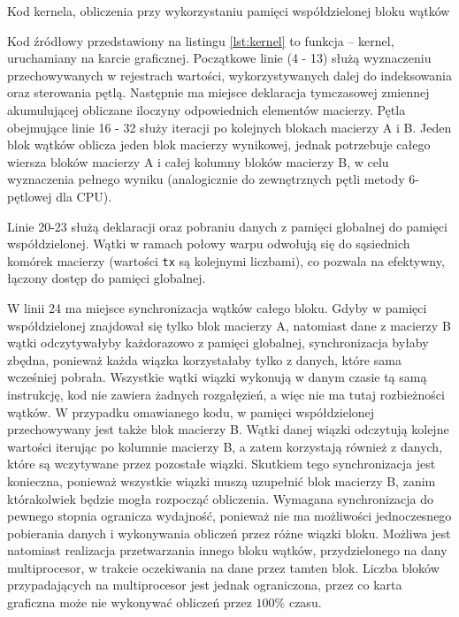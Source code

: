 \documentclass[12pt,a4paper]{article}
\begin{document}

\begin{listing}[ht!]
\inputminted{cuda}{listings/kernel.cu}
\caption{Kod kernela, obliczenia przy wykorzystaniu pamięci współdzielonej bloku wątków}
\label{lst:kernel}
\end{listing}

Kod źródłowy przedstawiony na listingu \ref{lst:kernel} to funkcja -- kernel, uruchamiany na karcie graficznej. Początkowe linie (4 - 13) służą wyznaczeniu przechowywanych w rejestrach wartości, wykorzystywanych dalej do indeksowania oraz sterowania pętlą. Następnie ma miejsce deklaracja tymczasowej zmiennej akumulującej obliczane iloczyny odpowiednich elementów macierzy. Pętla obejmujące linie 16 - 32 służy iteracji po kolejnych blokach macierzy A i B. Jeden blok wątków oblicza jeden blok macierzy wynikowej, jednak potrzebuje całego wiersza bloków macierzy A i całej kolumny bloków macierzy B, w celu wyznaczenia pełnego wyniku (analogicznie do zewnętrznych pętli metody 6-pętlowej dla CPU).

Linie 20-23 służą deklaracji oraz pobraniu danych z pamięci globalnej do pamięci współdzielonej. Wątki w ramach połowy warpu odwołują się do sąsiednich komórek macierzy (wartości \verb|tx| są kolejnymi liczbami), co pozwala na efektywny, łączony dostęp do pamięci globalnej.

W linii 24 ma miejsce synchronizacja wątków całego bloku. Gdyby w pamięci współdzielonej znajdował się tylko blok macierzy A, natomiast dane z macierzy B wątki odczytywałyby każdorazowo z pamięci globalnej, synchronizacja byłaby zbędna, ponieważ każda wiązka korzystałaby tylko z danych, które sama wcześniej pobrała. Wszystkie wątki wiązki wykonują w danym czasie tą samą instrukcję, kod nie zawiera żadnych rozgałęzień, a więc nie ma tutaj rozbieżności wątków. W przypadku omawianego kodu, w pamięci współdzielonej przechowywany jest także blok macierzy B.
Wątki danej wiązki odczytują kolejne wartości iterując po kolumnie macierzy B, a zatem korzystają również z danych, które są wczytywane przez pozostałe wiązki. Skutkiem tego synchronizacja jest konieczna, ponieważ wszystkie wiązki muszą uzupełnić blok macierzy B, zanim którakolwiek będzie mogła rozpocząć obliczenia. Wymagana synchronizacja do pewnego stopnia ogranicza wydajność, ponieważ nie ma możliwości jednoczesnego pobierania danych i wykonywania obliczeń przez różne wiązki bloku. Możliwa jest natomiast realizacja przetwarzania innego bloku wątków, przydzielonego na dany multiprocesor, w trakcie oczekiwania na dane przez tamten blok. Liczba bloków przypadających na multiprocesor jest jednak ograniczona, przez co karta graficzna może nie wykonywać obliczeń przez $100\%$ czasu.
\end{document}
